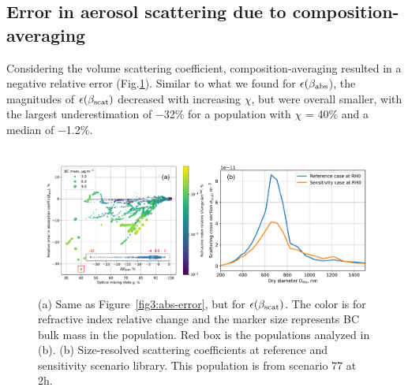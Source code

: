 \documentclass[edeposit,fullpage]{uiucthesis2009}
\begin{document}


\subsection{Error in aerosol scattering due to composition-averaging}
Considering the volume scattering coefficient, composition-averaging
resulted in a negative relative error
(Fig.\ref{fig6:scat-err}). Similar to what we found for
$\epsilon(\beta_{\rm abs}$), the magnitudes of $\epsilon(\beta_{\rm
  scat})$ decreased with increasing $\chi$, but were overall smaller,
with the largest underestimation of $-$32\% for a population with
$\chi$ = 40\% and a median of $-$1.2\%.

\begin{figure}
	\centering
	\includegraphics[scale=0.50]{chap4_figs/fig6.pdf}
	\caption{(a) Same as Figure~\ref{fig3:abs-error}, but for
          $\epsilon({\beta_{\rm scat}})$. The color is for
          refractive index relative change and the marker size represents BC bulk
          mass in the population. Red box is the populations analyzed in (b). 
          (b) Size-resolved scattering coefficients at
          reference and sensitivity scenario library.  This population
          is from scenario 77 at 2h.}
	\label{fig6:scat-err}
\end{figure}
\end{document}
